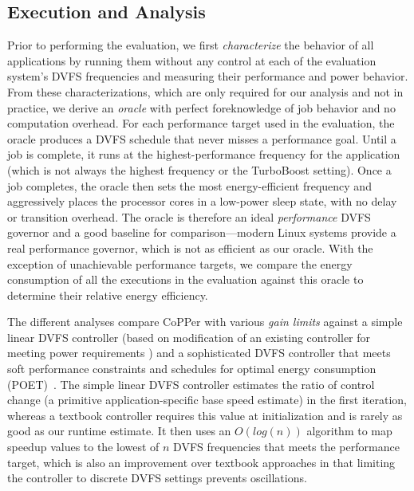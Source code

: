 \subsection{Execution and Analysis}
\label{sec:copper-analysis}

Prior to performing the evaluation, we first \emph{characterize} the behavior of all applications by running them without any control at each of the evaluation system's DVFS frequencies and measuring their performance and power behavior.
From these characterizations, which are only required for our analysis and not in practice, we derive an \emph{oracle} with perfect foreknowledge of job behavior and no computation overhead.
For each performance target used in the evaluation, the oracle produces a DVFS schedule that never misses a performance goal.
Until a job is complete, it runs at the highest-performance frequency for the application (which is not always the highest frequency or the TurboBoost setting).
Once a job completes, the oracle then sets the most energy-efficient frequency and aggressively places the processor cores in a low-power sleep state, with no delay or transition overhead.
The oracle is therefore an ideal \emph{performance} DVFS governor and a good baseline for comparison---modern Linux systems provide a real performance governor, which is not as efficient as our oracle.
With the exception of unachievable performance targets, we compare the energy consumption of all the executions in the evaluation against this oracle to determine their relative energy efficiency.

The different analyses compare CoPPer with various \emph{gain limits} against a simple linear DVFS controller (based on modification of an existing controller for meeting power requirements \cite{lefurgy2008power}) and a sophisticated DVFS controller that meets soft performance constraints and schedules for optimal energy consumption (POET)~\cite{POET}.
The simple linear DVFS controller estimates the ratio of control change (a primitive application-specific base speed estimate) in the first iteration, whereas a textbook controller requires this value at initialization and is rarely as good as our runtime estimate.
It then uses an $O(log(n))$ algorithm to map speedup values to the lowest of $n$ DVFS frequencies that meets the performance target, which is also an improvement over textbook approaches in that limiting the controller to discrete DVFS settings prevents oscillations.

